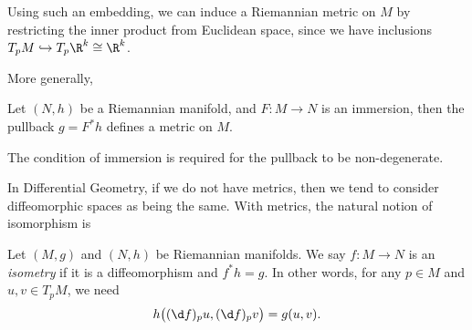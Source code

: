 \documentclass[a4paper]{article}
\begin{document}
Using such an embedding, we can induce a Riemannian metric on $M$ by restricting the inner product from Euclidean space, since we have inclusions $T_pM \hookrightarrow T_p \R^k \cong \R^k$.

More generally,
\begin{lemma}
  Let $(N, h)$ be a Riemannian manifold, and $F: M \to N$ is an immersion, then the pullback $g = F^*h$ defines a metric on $M$.
\end{lemma}
The condition of immersion is required for the pullback to be non-degenerate.

In Differential Geometry, if we do not have metrics, then we tend to consider diffeomorphic spaces as being the same. With metrics, the natural notion of isomorphism is
\begin{defi}[Isometry]
  Let $(M, g)$ and $(N, h)$ be Riemannian manifolds. We say $f: M \to N$ is an \emph{isometry} if it is a diffeomorphism and $f^*h = g$. In other words, for any $p \in M$ and $u, v \in T_p M$, we need
  \[
    h\big((\d f)_p u, (\d f)_p v\big) = g(u, v).
  \]
\end{defi}
\end{document}
